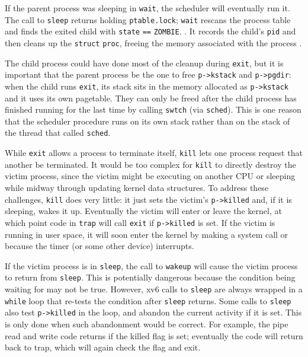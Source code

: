 If the parent process was sleeping in
\lstinline{wait},
the scheduler will eventually run it.
The call to
\lstinline{sleep}
returns holding
\lstinline{ptable.lock};
\lstinline{wait}
rescans the process table
and finds the exited child with
\lstinline{state}
\lstinline{==}
\lstinline{ZOMBIE}.
.
It records the child's
\lstinline{pid}
and then cleans up the 
\lstinline{struct} 
\lstinline{proc},
freeing the memory associated
with the process
.

The child process could have done most
of the cleanup during
\lstinline{exit},
but it is important that the parent 
process be the one to free
\lstinline{p->kstack} 
and 
\lstinline{p->pgdir}:
when the child runs
\lstinline{exit},
its stack sits in the memory allocated as
\lstinline{p->kstack} 
and it uses its own pagetable.
They can only be freed after the child process has
finished running for the last time by calling
\lstinline{swtch}
(via
\lstinline{sched}).
This is one reason that the scheduler procedure runs on its
own stack rather than on the stack of the thread
that called
\lstinline{sched}.

While
\lstinline{exit} 
allows a process to terminate itself,
\lstinline{kill}
lets one process request that another be terminated.
It would be too complex for
\lstinline{kill}
to directly destroy the victim process, since the victim
might be executing on another CPU or sleeping
while midway through updating kernel data structures.
To address these challenges, 
\lstinline{kill}
does very little: it just sets the victim's
\lstinline{p->killed}
and, if it is sleeping, wakes it up.
Eventually the victim will enter or leave the kernel,
at which point code in
\lstinline{trap}
will call
\lstinline{exit}
if
\lstinline{p->killed}
is set.
If the victim is running in user space, it will soon enter
the kernel by making a system call or because the timer (or
some other device) interrupts.

If the victim process is in
\lstinline{sleep},
the call to
\lstinline{wakeup}
will cause the victim process to return from
\lstinline{sleep}.
This is potentially dangerous because 
the condition being waiting for may not be true.
However, xv6 calls to
\lstinline{sleep}
are always wrapped in a
\lstinline{while}
loop that re-tests the condition after
\lstinline{sleep}
returns.
Some calls to
\lstinline{sleep}
also test
\lstinline{p->killed}
in the loop, and abandon the current activity if it is set.
This is only done when such abandonment would be correct.
For example, the pipe read and write code
returns if the killed flag is set; eventually the
code will return back to trap, which will again
check the flag and exit.

